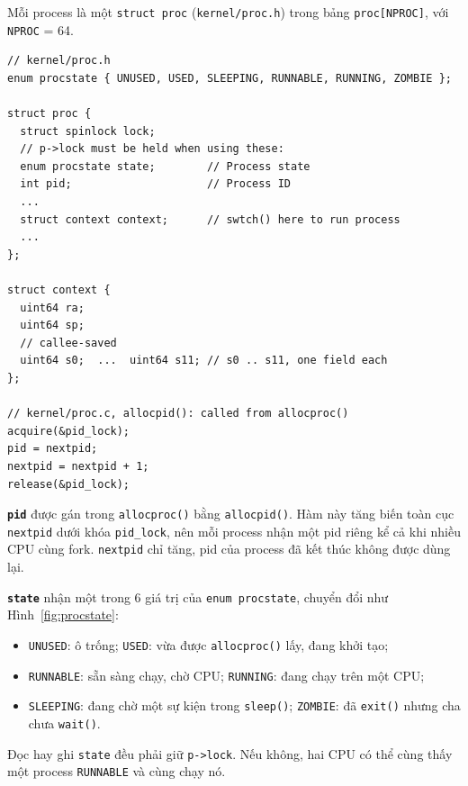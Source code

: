 Mỗi process là một \texttt{struct proc} (\texttt{kernel/proc.h}) trong bảng \texttt{proc[NPROC]}, với \texttt{NPROC} = 64.

\begin{lstlisting}[style=xv6code]
// kernel/proc.h
enum procstate { UNUSED, USED, SLEEPING, RUNNABLE, RUNNING, ZOMBIE };

struct proc {
  struct spinlock lock;
  // p->lock must be held when using these:
  enum procstate state;        // Process state
  int pid;                     // Process ID
  ...
  struct context context;      // swtch() here to run process
  ...
};

struct context {
  uint64 ra;
  uint64 sp;
  // callee-saved
  uint64 s0;  ...  uint64 s11; // s0 .. s11, one field each
};

// kernel/proc.c, allocpid(): called from allocproc()
acquire(&pid_lock);
pid = nextpid;
nextpid = nextpid + 1;
release(&pid_lock);
\end{lstlisting}

\textbf{\texttt{pid}} được gán trong \texttt{allocproc()} bằng \texttt{allocpid()}. Hàm này tăng biến toàn cục \texttt{nextpid} dưới khóa \texttt{pid\_lock}, nên mỗi process nhận một pid riêng kể cả khi nhiều CPU cùng fork. \texttt{nextpid} chỉ tăng, pid của process đã kết thúc không được dùng lại.

\textbf{\texttt{state}} nhận một trong 6 giá trị của \texttt{enum procstate}, chuyển đổi như Hình~\ref{fig:procstate}:
\begin{itemize}
    \item \texttt{UNUSED}: ô trống; \texttt{USED}: vừa được \texttt{allocproc()} lấy, đang khởi tạo;
    \item \texttt{RUNNABLE}: sẵn sàng chạy, chờ CPU; \texttt{RUNNING}: đang chạy trên một CPU;
    \item \texttt{SLEEPING}: đang chờ một sự kiện trong \texttt{sleep()}; \texttt{ZOMBIE}: đã \texttt{exit()} nhưng cha chưa \texttt{wait()}.
\end{itemize}
Đọc hay ghi \texttt{state} đều phải giữ \texttt{p->lock}. Nếu không, hai CPU có thể cùng thấy một process \texttt{RUNNABLE} và cùng chạy nó.

